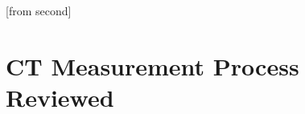 

\usepackage{transparent}

\usepackage{subcaption}
\usepackage{wrapfig}
\usepackage{bm}
\usepackage{ragged2e}

\def\mat#1{\ensuremath{\bm #1}}

\hypersetup{
    colorlinks=true,        %
    linkcolor=faublue,      %
    linktoc=none
}


[from second]

\usetikzlibrary{decorations.pathreplacing,calc}

\newcommand{\tikzmark}[1]{\tikz[overlay,remember picture] \node (#1) {};}
 

\DeclareMathOperator*{\argmin}{argmin}

\renewcommand{\vec}[1]{\boldsymbol{#1}}


\subtitle{Spectral Computed Tomography}


\AtBeginSubsection[]{
    {

    }
}



\frame[plain,c]{\titlepage} %

\begin{frame}
	\frametitle{\insertsubtitle}

	\tableofcontents
\end{frame}

\section{CT Measurement Process Reviewed}

